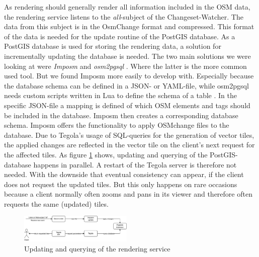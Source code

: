 \documentclass[conference]{IEEEtran}
\begin{document}
As rendering should generally render all information included in the OSM data, the rendering service listens to the \textit{all}-subject of the Changeset-Watcher. The data from this subject is in the OsmChange format and compressed. This format of the data is needed for the update routine of the PostGIS database. As a PostGIS database is used for storing the rendering data, a solution for incrementally updating the database is needed. The two main solutions we were looking at were \textit{Imposm} \cite{noauthor_imposm_2022} and \textit{osm2pgsql} \cite{noauthor_osm2pgsql_2022}. Where the latter is the more common used tool. But we found Imposm more easily to develop with. Especially because the database schema can be defined in a JSON- or YAML-file, while osm2pgsql needs custom scripts written in Lua to define the schema of a table \cite{noauthor_imposm_2022}\cite{noauthor_osm2pgsql_nodate}. In the specific JSON-file a mapping is defined of which OSM elements and tags should be included in the database. Imposm then creates a corresponding database schema. Imposm offers the functionality to apply OSMchange files to the database. Due to Tegola's usage of SQL-queries for the generation of vector tiles, the applied changes are reflected in the vector tile on the client's next request for the affected tiles. As figure \ref{fig:renderer_squence} shows, updating and querying of the PostGIS-database happens in parallel. A restart of the Tegola server is therefore not needed. With the downside that eventual consistency can appear, if the client does not request the updated tiles. But this only happens on rare occasions because a client normally often zooms and pans in its viewer and therefore often requests the same (updated) tiles. 
\begin{figure}[h]
    \centering
    \includegraphics[width=0.48\textwidth]{figures/renderer.pdf}
    \caption{Updating and querying of the rendering service}
    \label{fig:renderer_squence}
\end{figure}
\end{document}
